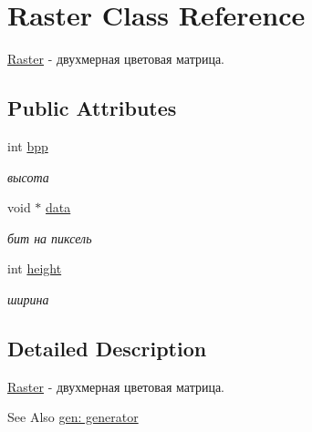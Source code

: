\hypertarget{struct_raster}{\section{Raster Class Reference}
\label{struct_raster}
}


\hyperlink{struct_raster}{Raster} -\/ двухмерная цветовая матрица.  


\subsection*{Public Attributes}
\begin{DoxyCompactItemize}
\item 
\hypertarget{struct_raster_abd3f336e3e08b82ced072c42a219b0e9}{int \hyperlink{struct_raster_abd3f336e3e08b82ced072c42a219b0e9}{bpp}}\label{struct_raster_abd3f336e3e08b82ced072c42a219b0e9}

\begin{DoxyCompactList}\small\item\em высота \end{DoxyCompactList}\item 
\hypertarget{struct_raster_a4d35f08f9e6acd1dacfd362679115f2a}{void $\ast$ \hyperlink{struct_raster_a4d35f08f9e6acd1dacfd362679115f2a}{data}}\label{struct_raster_a4d35f08f9e6acd1dacfd362679115f2a}

\begin{DoxyCompactList}\small\item\em бит на пиксель \end{DoxyCompactList}\item 
\hypertarget{struct_raster_a8da4e9db2e316976755532677b9ae464}{int \hyperlink{struct_raster_a8da4e9db2e316976755532677b9ae464}{height}}\label{struct_raster_a8da4e9db2e316976755532677b9ae464}

\begin{DoxyCompactList}\small\item\em ширина \end{DoxyCompactList}\end{DoxyCompactItemize}


\subsection{Detailed Description}
\hyperlink{struct_raster}{Raster} -\/ двухмерная цветовая матрица. 

\begin{DoxySeeAlso}{See Also}
\hyperlink{group__generator}{gen\-: generator} 
\end{DoxySeeAlso}
